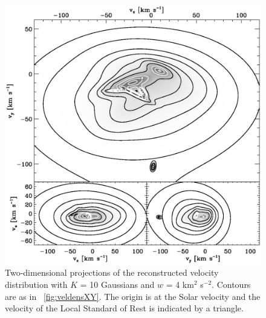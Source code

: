 \clearpage
\begin{figure}
\includegraphics[width=\textwidth]{annotated_veldist.ps}
\caption{Two-dimensional projections of the reconstructed velocity distribution with $K$ = 10 Gaussians and $w$ = 4 km$^2$ s$^{-2}$. Contours are as in \figurename~\ref{fig:veldensXY}. The origin is at the Solar velocity and the velocity of the Local Standard of Rest \citep{2005ApJ...629..268H} is indicated by a triangle.}%
\label{fig:annotated_veldist}
\end{figure}

